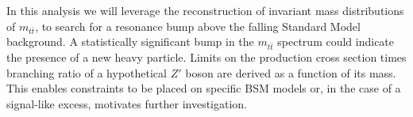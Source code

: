 In this analysis we will leverage the reconstruction of invariant mass distributions of \( m_{t\bar{t}} \), to search for a resonance bump above the falling Standard Model background. A statistically significant bump in the \( m_{t\bar{t}} \) spectrum could indicate the presence of a new heavy particle. Limits on the production cross section times branching ratio of a hypothetical \( Z' \) boson are derived as a function of its mass. This enables constraints to be placed on specific BSM models or, in the case of a signal-like excess, motivates further investigation.